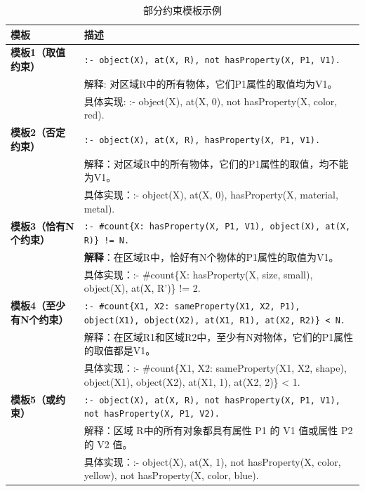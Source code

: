 \begin{table}[!h]
    \centering
    \renewcommand{\arraystretch}{1.0}
    \begin{tabular}{|p{3cm}|p{12cm}|}
        \hline
        \textbf{模板} & \textbf{描述} \\
        \hline
        \textbf{模板1（取值约束）} & 
        \texttt{:- object(X), at(X, R), not hasProperty(X, P1, V1).} \\ 
        & 解释: 对区域R中的所有物体，它们P1属性的取值均为V1。 \\ 
        & 具体实现: :- object(X), at(X, 0), not hasProperty(X, color, red). \\
        \hline
        
        \textbf{模板2（否定约束）} & 
        \texttt{:- object(X), at(X, R), hasProperty(X, P1, V1).} \\ 
        & 解释：对区域R中的所有物体，它们的P1属性的取值，均不能为V1。 \\ 
        & 具体实现：:- object(X), at(X, 0), hasProperty(X, material, metal). \\
        \hline
        
        \textbf{模板3（恰有N个约束）} & 
        \texttt{:- \#count\{X: hasProperty(X, P1, V1), object(X), at(X, R)\} != N.} \\ 
        & \textbf{解释}：在区域R中，恰好有N个物体的P1属性的取值为V1。 \\ 
        & 具体实现：:- \#count\{X: hasProperty(X, size, small), object(X), at(X, R')\} != 2. \\
        \hline
        
        \textbf{模板4（至少有N个约束）} & 
        \texttt{:- \#count\{X1, X2: sameProperty(X1, X2, P1), object(X1), object(X2), at(X1, R1), at(X2, R2)\} < N.} \\ 
        & 解释：在区域R1和区域R2中，至少有N对物体，它们的P1属性的取值都是V1。 \\ 
        & 具体实现：:- \#count\{X1, X2: sameProperty(X1, X2, shape), object(X1), object(X2), at(X1, 1), at(X2, 2)\} < 1. \\
        \hline
        
        \textbf{模板5（或约束）} & 
        \texttt{:- object(X), at(X, R), not hasProperty(X, P1, V1), not hasProperty(X, P1, V2).} \\ 
        & 解释：区域 R中的所有对象都具有属性 P1 的 V1 值或属性 P2 的 V2 值。 \\ 
        & 具体实现：:- object(X), at(X, 1), not hasProperty(X, color, yellow), not hasProperty(X, color, blue). \\
        \hline
    \end{tabular}
    \caption{部分约束模板示例}
    \label{tab:asp_templates}
\end{table}
